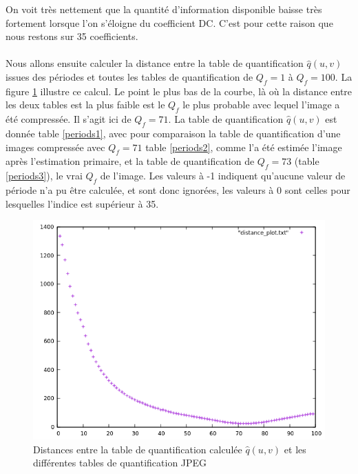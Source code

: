 \documentclass[utf8,final]{stageM2R} %
\begin{document}
On voit très nettement que la quantité d'information disponible baisse très fortement lorsque l'on s'éloigne du coefficient DC. C'est pour cette raison que nous restons sur 35 coefficients.

\paragraph{}
Nous allons ensuite calculer la distance entre la table de quantification $\widehat{q}(u,v)$ issues des périodes et toutes les tables de quantification de $Q_f = 1$ à $Q_f = 100$. La figure \ref{fig:distances} illustre ce calcul. Le point le plus bas de la courbe, là où la distance entre les deux tables est la plus faible est le $Q_f$ le plus probable avec lequel l'image a été compressée. Il s'agit ici de $Q_f = 71$. La table de quantification $\widehat{q}(u,v)$ est donnée table \ref{periods1}, avec pour comparaison la table de quantification d'une images compressée avec $Q_f = 71$ table \ref{periods2}, comme l'a été estimée l'image après l'estimation primaire, et la table de quantification de $Q_f = 73$ (table \ref{periods3}), le vrai $Q_f$ de l'image. Les valeurs à -1 indiquent qu'aucune valeur de période n'a pu être calculée, et sont donc ignorées, les valeurs à 0 sont celles pour lesquelles l'indice est supérieur à 35.

\begin{figure}
  \centering
  \includegraphics[width=0.7\linewidth]{images/distances}

  \caption{Distances entre la table de quantification calculée $\widehat{q}(u,v)$ et les différentes tables de quantification JPEG}
  \label{fig:distances}
\end{figure}
\end{document}
